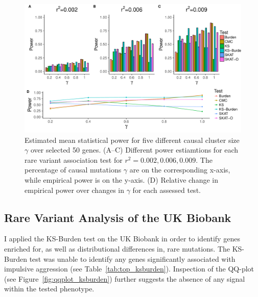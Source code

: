 \begin{figure}[ht!]
  \centering
  \includegraphics[width=1.0\linewidth]{ksburden/figures/combined_power_analysis.pdf}
  \caption[Estimated mean statistical power]{Estimated mean statistical power for five different causal cluster size $\gamma$ over selected 50 genes.
    (A--C) Different power estiamtions for each rare variant association test for $r^2=0.002, 0.006, 0.009$.
    The percentage of causal mutations $\gamma$ are on the corresponding x-axis, while empirical power is on the y-axis.
    (D) Relative change in empirical power over changes in $\gamma$ for each assessed test.\label{fig:simulatedGeneRealData}}
\end{figure}


\subsection{Rare Variant Analysis of the UK Biobank}
\label{sub:ukbiobank_aggression}

I applied the KS-Burden test on the UK Biobank in order to identify genes enriched for, as well as distributional differences in, rare mutations. 
The KS-Burden test was unable to identify any genes significantly associated with impulsive aggression (see Table~\ref{tab:top_ksburden}).
Inspection of the QQ-plot (see Figure~\ref{fig:qqplot_ksburden}) further suggests the absence of any signal within the tested phenotype.


